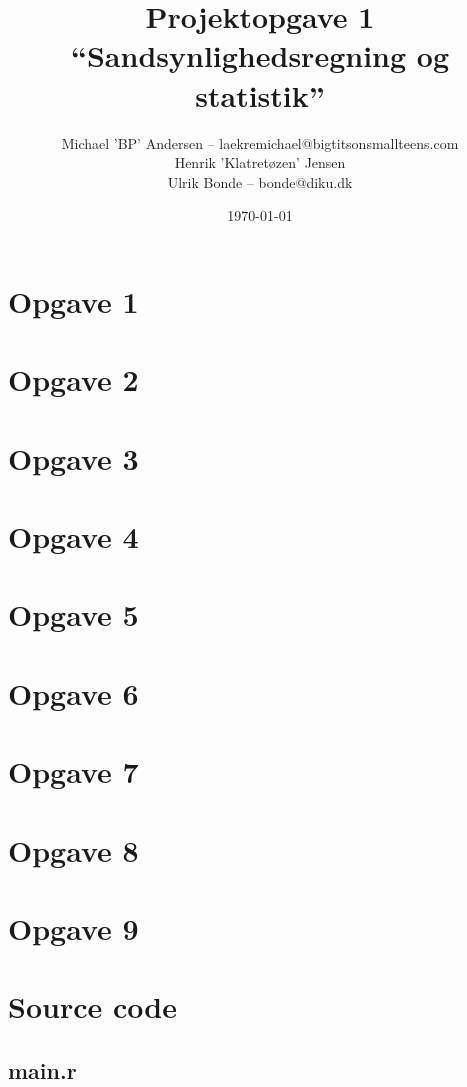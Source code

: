 \documentclass[a4paper, 10pt, final]{article}
\title{Projektopgave 1\\ ``Sandsynlighedsregning og statistik''}
\author{Michael 'BP' Andersen -- laekremichael@bigtitsonsmallteens.com\\ Henrik 'Klatretøzen' Jensen \\ Ulrik Bonde -- bonde@diku.dk}
\date{\today}
\begin{document}
\maketitle
\thispagestyle{empty}

\section*{Opgave 1}


\section*{Opgave 2}


\section*{Opgave 3}


\section*{Opgave 4}

\section*{Opgave 5}


\section*{Opgave 6}

\section*{Opgave 7}

\section*{Opgave 8}

\section*{Opgave 9}
\newpage

\appendix

\section{Source code}
\subsection{main.r \label{app_source1}}

\end{document}
